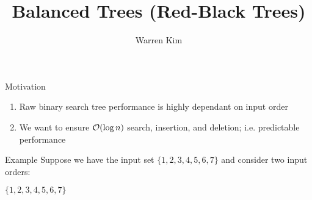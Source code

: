 \documentclass[aspectratio=169]{beamer}
\title{Balanced Trees (Red-Black Trees)}
\author{Warren Kim}
\date{}
\begin{document}
\maketitle

\begin{frame}{Motivation}
    \begin{enumerate}[label=\textit{(\roman*)}]
        \item Raw binary search tree performance is highly dependant on input order
        \item We want to ensure ${\cal{O}}(\log n)$ search, insertion, and deletion; i.e. predictable
            performance
    \end{enumerate}
\end{frame}

\begin{frame}[fragile]{Example}
    Suppose we have the input set $\{1, 2, 3, 4, 5, 6, 7\}$ and consider two input orders:
    \newline
    \newline
    \begin{minipage}{.45\textwidth}
        \centering
        $\{1, 2, 3, 4, 5, 6, 7\}$ 
        \newline
        \newline
\end{minipage}
\end{frame}
\end{document}
